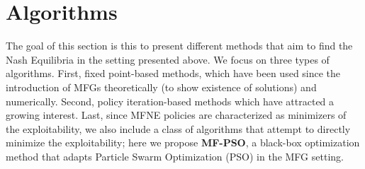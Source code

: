 \documentclass[10pt,twocolumn,letterpaper]{article}
\theoremstyle{definition}
\theoremstyle{remark}
\begin{document}
\section{Algorithms}
The goal of this section is this to present different methods that aim to find the Nash Equilibria in the setting presented above. We focus on three types of algorithms. First, fixed point-based methods, which have been used since the introduction of MFGs theoretically (to show existence of solutions) and numerically. Second, policy iteration-based methods which have attracted a growing interest. Last, since MFNE policies are characterized as minimizers of the exploitability, we also include a class of algorithms that attempt to directly minimize the exploitability; here we propose \textbf{MF-PSO}, a black-box optimization method that adapts Particle Swarm Optimization (PSO) in the MFG setting.
\end{document}
